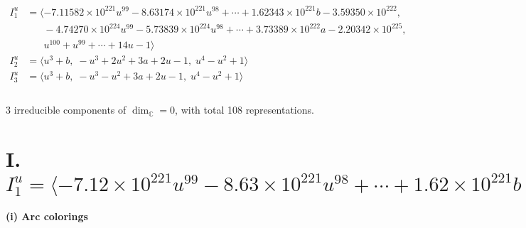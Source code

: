 \documentclass[1p]{elsarticle_modified}
\theoremstyle{definition}
\begin{document}
\begin{align*}
I^u_{1}&=\langle 
-7.11582\times10^{221} u^{99}-8.63174\times10^{221} u^{98}+\cdots+1.62343\times10^{221} b-3.59350\times10^{222},\\
\phantom{I^u_{1}}&\phantom{= \langle  }-4.74270\times10^{224} u^{99}-5.73839\times10^{224} u^{98}+\cdots+3.73389\times10^{222} a-2.20342\times10^{225},\\
\phantom{I^u_{1}}&\phantom{= \langle  }u^{100}+u^{99}+\cdots+14 u-1\rangle \\
I^u_{2}&=\langle 
u^3+b,\;- u^3+2 u^2+3 a+2 u-1,\;u^4- u^2+1\rangle \\
I^u_{3}&=\langle 
u^3+b,\;- u^3- u^2+3 a+2 u-1,\;u^4- u^2+1\rangle \\
\\
\end{align*}
\raggedright * 3 irreducible components of $\dim_{\mathbb{C}}=0$, with total 108 representations.\\
\newpage
\renewcommand{\arraystretch}{1}
\centering \section*{I. $I^u_{1}= \langle -7.12\times10^{221} u^{99}-8.63\times10^{221} u^{98}+\cdots+1.62\times10^{221} b-3.59\times10^{222},\;-4.74\times10^{224} u^{99}-5.74\times10^{224} u^{98}+\cdots+3.73\times10^{222} a-2.20\times10^{225},\;u^{100}+u^{99}+\cdots+14 u-1 \rangle$}
\flushleft \textbf{(i) Arc colorings}\\
\end{document}
